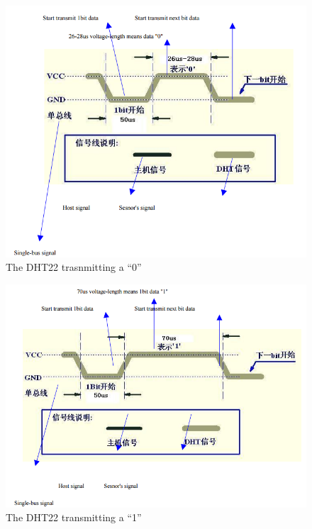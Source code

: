 			\begin{figure}[h!]
				\centering
				\includegraphics[width=\textwidth, angle=0]{DHT22low}
				\caption{The DHT22 trasnmitting a ``0''}
				\label{fig:DHT22low}
			\end{figure}
			
			\begin{figure}[h!]
				\centering
				\includegraphics[width=\textwidth, angle=0]{DHT22high}
				\caption{The DHT22 transmitting a ``1''}
				\label{fig:DHT22high}
			\end{figure}
			
			\clearpage
			

